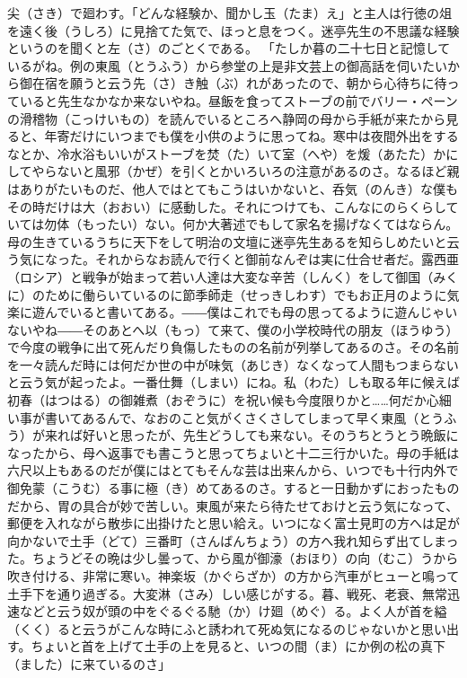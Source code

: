 \documentclass{book}
\begin{document}
尖（さき）で廻わす。「どんな経験か、聞かし玉（たま）え」と主人は行徳の俎を遠く後（うしろ）に見捨てた気で、ほっと息をつく。迷亭先生の不思議な経験というのを聞くと左（さ）のごとくである。
「たしか暮の二十七日と記憶しているがね。例の東風（とうふう）から参堂の上是非文芸上の御高話を伺いたいから御在宿を願うと云う先（さ）き触（ぶ）れがあったので、朝から心待ちに待っていると先生なかなか来ないやね。昼飯を食ってストーブの前でバリー・ペーンの滑稽物（こっけいもの）を読んでいるところへ静岡の母から手紙が来たから見ると、年寄だけにいつまでも僕を小供のように思ってね。寒中は夜間外出をするなとか、冷水浴もいいがストーブを焚（た）いて室（へや）を煖（あたた）かにしてやらないと風邪（かぜ）を引くとかいろいろの注意があるのさ。なるほど親はありがたいものだ、他人ではとてもこうはいかないと、呑気（のんき）な僕もその時だけは大（おおい）に感動した。それにつけても、こんなにのらくらしていては勿体（もったい）ない。何か大著述でもして家名を揚げなくてはならん。母の生きているうちに天下をして明治の文壇に迷亭先生あるを知らしめたいと云う気になった。それからなお読んで行くと御前なんぞは実に仕合せ者だ。露西亜（ロシア）と戦争が始まって若い人達は大変な辛苦（しんく）をして御国（みくに）のために働らいているのに節季師走（せっきしわす）でもお正月のように気楽に遊んでいると書いてある。――僕はこれでも母の思ってるように遊んじゃいないやね――そのあとへ以（もっ）て来て、僕の小学校時代の朋友（ほうゆう）で今度の戦争に出て死んだり負傷したものの名前が列挙してあるのさ。その名前を一々読んだ時には何だか世の中が味気（あじき）なくなって人間もつまらないと云う気が起ったよ。一番仕舞（しまい）にね。私（わた）しも取る年に候えば初春（はつはる）の御雑煮（おぞうに）を祝い候も今度限りかと\ldots{}\ldots{}何だか心細い事が書いてあるんで、なおのこと気がくさくさしてしまって早く東風（とうふう）が来れば好いと思ったが、先生どうしても来ない。そのうちとうとう晩飯になったから、母へ返事でも書こうと思ってちょいと十二三行かいた。母の手紙は六尺以上もあるのだが僕にはとてもそんな芸は出来んから、いつでも十行内外で御免蒙（こうむ）る事に極（き）めてあるのさ。すると一日動かずにおったものだから、胃の具合が妙で苦しい。東風が来たら待たせておけと云う気になって、郵便を入れながら散歩に出掛けたと思い給え。いつになく富士見町の方へは足が向かないで土手（どて）三番町（さんばんちょう）の方へ我れ知らず出てしまった。ちょうどその晩は少し曇って、から風が御濠（おほり）の向（むこ）うから吹き付ける、非常に寒い。神楽坂（かぐらざか）の方から汽車がヒューと鳴って土手下を通り過ぎる。大変淋（さみ）しい感じがする。暮、戦死、老衰、無常迅速などと云う奴が頭の中をぐるぐる馳（か）け廻（めぐ）る。よく人が首を縊（くく）ると云うがこんな時にふと誘われて死ぬ気になるのじゃないかと思い出す。ちょいと首を上げて土手の上を見ると、いつの間（ま）にか例の松の真下（ました）に来ているのさ」
\end{document}
